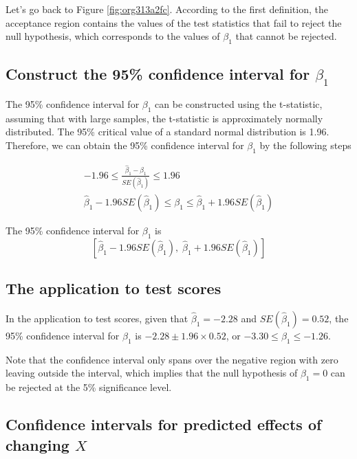 \documentclass[a4paper,11pt]{article}
\begin{document}
Let's go back to Figure \ref{fig:org313a2fc}. According to the first
definition, the acceptance region contains the values of the
test statistics that fail to reject the null hypothesis,
which corresponds to the values of \(\beta_1\) that cannot be rejected. 


\subsection{Construct the 95\% confidence interval for \(\beta_1\)}
\label{sec:org57bc5c6}

The 95\% confidence interval for \(\beta_1\) can be constructed using the
t-statistic, assuming that with large samples, the t-statistic is
approximately normally distributed. The 95\% critical value of a
standard normal distribution is 1.96. Therefore, we can obtain the 95\%
confidence interval for \(\beta_1\) by the following steps

\begin{gather*}
-1.96 \leq \frac{\hat{\beta}_1 - \beta_1}{SE(\hat{\beta}_1)} \leq 1.96 \\
\hat{\beta}_1 - 1.96 SE(\hat{\beta}_1) \leq \beta_1 \leq \hat{\beta}_1 + 1.96 SE(\hat{\beta}_1)
\end{gather*}

The 95\% confidence interval for \(\beta_1\) is 
\[ \left[ \hat{\beta}_1 - 1.96 SE(\hat{\beta}_1),\; \hat{\beta}_1 + 1.96
SE(\hat{\beta}_1) \right] \]


\subsection{The application to test scores}
\label{sec:org62bfc60}

In the application to test scores, given that \(\hat{\beta}_1 = -2.28\)
and \(SE(\hat{\beta}_1) = 0.52\), the 95\% confidence interval for
\(\beta_1\) is \({-2.28 \pm 1.96 \times 0.52}\), or \(-3.30 \leq \beta_1
\leq -1.26\). 

Note that the confidence interval only spans over the negative
region with zero leaving outside the interval, which implies that the
null hypothesis of \(\beta_1 = 0\) can be rejected at the 5\%
significance level.


\subsection{Confidence intervals for predicted effects of changing \(X\)}
\label{sec:org649c380}
\end{document}
